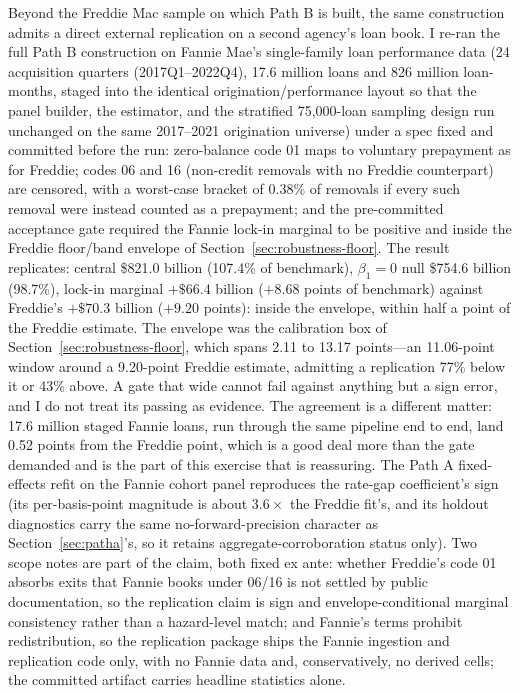 \documentclass[12pt]{article}
\begin{document}
Beyond the Freddie Mac sample on which Path B is built, the same construction admits a direct external replication on a second agency's loan book. I re-ran the full Path B construction on Fannie Mae's single-family loan performance data (24 acquisition quarters (2017Q1--2022Q4), 17.6 million loans and 826 million loan-months, staged into the identical origination/performance layout so that the panel builder, the estimator, and the stratified 75{,}000-loan sampling design run unchanged on the same 2017--2021 origination universe) under a spec fixed and committed before the run: zero-balance code 01 maps to voluntary prepayment as for Freddie; codes 06 and 16 (non-credit removals with no Freddie counterpart) are censored, with a worst-case bracket of 0.38\% of removals if every such removal were instead counted as a prepayment; and the pre-committed acceptance gate required the Fannie lock-in marginal to be positive and inside the Freddie floor/band envelope of Section~\ref{sec:robustness-floor}. The result replicates: central \$821.0 billion (107.4\% of benchmark), $\beta_1 = 0$ null \$754.6 billion (98.7\%), lock-in marginal $+\$66.4$ billion ($+8.68$ points of benchmark) against Freddie's $+\$70.3$ billion ($+9.20$ points): inside the envelope, within half a point of the Freddie estimate. The envelope was the calibration box of Section~\ref{sec:robustness-floor}, which spans 2.11 to 13.17 points---an 11.06-point window around a 9.20-point Freddie estimate, admitting a replication 77\% below it or 43\% above. A gate that wide cannot fail against anything but a sign error, and I do not treat its passing as evidence. The agreement is a different matter: 17.6 million staged Fannie loans, run through the same pipeline end to end, land 0.52 points from the Freddie point, which is a good deal more than the gate demanded and is the part of this exercise that is reassuring. The Path A fixed-effects refit on the Fannie cohort panel reproduces the rate-gap coefficient's sign (its per-basis-point magnitude is about $3.6\times$ the Freddie fit's, and its holdout diagnostics carry the same no-forward-precision character as Section~\ref{sec:patha}'s, so it retains aggregate-corroboration status only). Two scope notes are part of the claim, both fixed ex ante: whether Freddie's code 01 absorbs exits that Fannie books under 06/16 is not settled by public documentation, so the replication claim is sign and envelope-conditional marginal consistency rather than a hazard-level match; and Fannie's terms prohibit redistribution, so the replication package ships the Fannie ingestion and replication code only, with no Fannie data and, conservatively, no derived cells; the committed artifact carries headline statistics alone.
\end{document}

